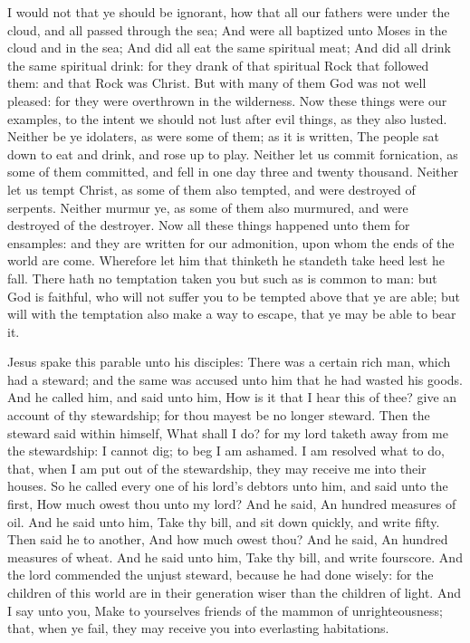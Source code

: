 \vspace{-0.5\baselineskip}

 I would not that ye should be ignorant, how that all our fathers were under the cloud, and all passed through the sea; And were all baptized unto Moses in the cloud and in the sea; And did all eat the same spiritual meat; And did all drink the same spiritual drink: for they drank of that spiritual Rock that followed them: and that Rock was Christ. But with many of them God was not well pleased: for they were overthrown in the wilderness. Now these things were our examples, to the intent we should not lust after evil things, as they also lusted. Neither be ye idolaters, as were some of them; as it is written, The people sat down to eat and drink, and rose up to play. Neither let us commit fornication, as some of them committed, and fell in one day three and twenty thousand. Neither let us tempt Christ, as some of them also tempted, and were destroyed of serpents. Neither murmur ye, as some of them also murmured, and were destroyed of the destroyer. Now all these things happened unto them for ensamples: and they are written for our admonition, upon whom the ends of the world are come. Wherefore let him that thinketh he standeth take heed lest he fall. There hath no temptation taken you but such as is common to man: but God is faithful, who will not suffer you to be tempted above that ye are able; but will with the temptation also make a way to escape, that ye may be able to bear it.


 Jesus spake this parable unto his disciples: There was a certain rich man, which had a steward; and the same was accused unto him that he had wasted his goods. And he called him, and said unto him, How is it that I hear this of thee? give an account of thy stewardship; for thou mayest be no longer steward. Then the steward said within himself, What shall I do? for my lord taketh away from me the stewardship: I cannot dig; to beg I am ashamed. I am resolved what to do, that, when I am put out of the stewardship, they may receive me into their houses. So he called every one of his lord's debtors unto him, and said unto the first, How much owest thou unto my lord? And he said, An hundred measures of oil. And he said unto him, Take thy bill, and sit down quickly, and write fifty. Then said he to another, And how much owest thou? And he said, An hundred measures of wheat. And he said unto him, Take thy bill, and write fourscore. And the lord commended the unjust steward, because he had done wisely: for the children of this world are in their generation wiser than the children of light. And I say unto you, Make to yourselves friends of the mammon of unrighteousness; that, when ye fail, they may receive you into everlasting habitations.

